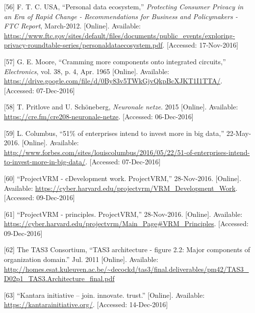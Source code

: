 \documentclass[12pt,english,a4paper,titlepage,cleardoublepage=empty,dottedtoc]{report}
\begin{document}
\hypertarget{ref-graphic_2012_personal-data-ecosystem}{}
{[}56{]} F. T. C. USA, ``Personal data ecosystem,'' \emph{Protecting
Consumer Privacy in an Era of Rapid Change - Recommendations for
Business and Policymakers - FTC Report}, March-2012. {[}Online{]}.
Available:
\url{https://www.ftc.gov/sites/default/files/documents/public_events/exploring-privacy-roundtable-series/personaldataecosystem.pdf}.
{[}Accessed: 17-Nov-2016{]}

\hypertarget{ref-paper_1965_moors-law}{}
{[}57{]} G. E. Moore, ``Cramming more components onto integrated
circuits,'' \emph{Electronics}, vol. 38, p. 4, Apr. 1965 {[}Online{]}.
Available:
\url{https://drive.google.com/file/d/0By83v5TWkGjvQkpBcXJKT1I1TTA/}.
{[}Accessed: 07-Dec-2016{]}

\hypertarget{ref-podcast_2015_cre-neuronale-netze}{}
{[}58{]} T. Pritlove and U. Schöneberg, \emph{Neuronale netze}. 2015
{[}Online{]}. Available: \url{https://cre.fm/cre208-neuronale-netze}.
{[}Accessed: 06-Dec-2016{]}

\hypertarget{ref-web_2016_industries-intention-to-invest-in-big-data}{}
{[}59{]} L. Columbus, ``51\% of enterprises intend to invest more in big
data,'' 22-May-2016. {[}Online{]}. Available:
\url{http://www.forbes.com/sites/louiscolumbus/2016/05/22/51-of-enterprises-intend-to-invest-more-in-big-data/}.
{[}Accessed: 07-Dec-2016{]}

\hypertarget{ref-web_2016_projectvrm_development-work}{}
{[}60{]} ``ProjectVRM - cDevelopment work. ProjectVRM,'' 28-Nov-2016.
{[}Online{]}. Available:
\url{https://cyber.harvard.edu/projectvrm/VRM_Development_Work}.
{[}Accessed: 09-Dec-2016{]}

\hypertarget{ref-web_2016_projectvrm_principles}{}
{[}61{]} ``ProjectVRM - principles. ProjectVRM,'' 28-Nov-2016.
{[}Online{]}. Available:
\url{https://cyber.harvard.edu/projectvrm/Main_Page\#VRM_Principles}.
{[}Accessed: 09-Dec-2016{]}

\hypertarget{ref-graphic_2011_architecture_components-of-organization-domain}{}
{[}62{]} The TAS3 Consortium, ``TAS3 architecture - figure 2.2: Major
components of organization domain.'' Jul. 2011 {[}Online{]}. Available:
\url{http://homes.esat.kuleuven.ac.be/~decockd/tas3/final.deliverables/pm42/TAS3_D02p1_TAS3.Architecture_final.pdf}

\hypertarget{ref-web_kantara-initiative}{}
{[}63{]} ``Kantara initiative -- join. innovate. trust.'' {[}Online{]}.
Available: \url{https://kantarainitiative.org/}. {[}Accessed:
14-Dec-2016{]}
\end{document}
